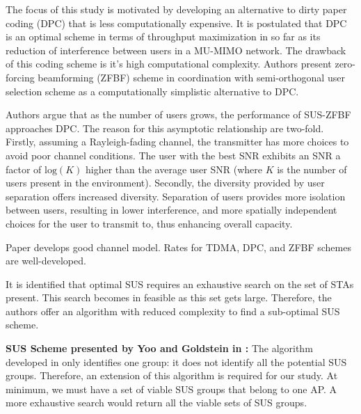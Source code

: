 The focus of this study is motivated by developing an alternative to dirty paper coding (DPC) that is less computationally expensive. It is postulated that DPC is an optimal scheme in terms of throughput maximization in so far as its reduction of interference between users in a MU-MIMO network. The drawback of this coding scheme is it's high computational complexity. Authors present zero-forcing beamforming (ZFBF) scheme in coordination with semi-orthogonal user selection scheme as a computationally simplistic alternative to DPC.

Authors argue that as the number of users grows, the performance of SUS-ZFBF approaches DPC. The reason for this asymptotic relationship are two-fold. Firstly, assuming a Rayleigh-fading channel, the transmitter has more choices to avoid poor channel conditions. The user with the best SNR exhibits an SNR a factor of $\text{log}(K)$ higher than the average user SNR (where $K$ is the number of users present in the environment). Secondly, the diversity provided by user separation offers increased diversity. Separation of users provides more isolation between users, resulting in lower interference, and more spatially independent choices for the user to transmit to, thus enhancing overall capacity.

Paper develops good channel model. Rates for TDMA, DPC, and ZFBF schemes are well-developed.

It is identified that optimal SUS requires an exhaustive search on the set of STAs present. This search becomes in feasible as this set gets large. Therefore, the authors offer an algorithm with reduced complexity to find a sub-optimal SUS scheme.

\textbf{SUS Scheme presented by Yoo and Goldstein in \cite{1603708}:}
The algorithm developed in \cite{1603708} only identifies one group: it does not identify all the potential SUS groups. Therefore, an extension of this algorithm is required for our study. At minimum, we must have a set of viable SUS groups that belong to one AP. A more exhaustive search would return all the viable sets of SUS groups. 

